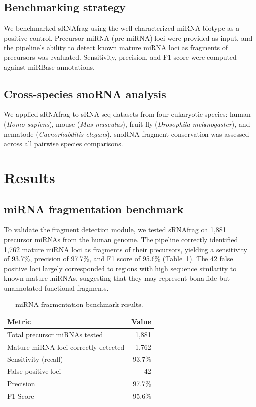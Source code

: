 \documentclass[11pt]{article}
\begin{document}
\subsection{Benchmarking strategy}

We benchmarked sRNAfrag using the well-characterized miRNA biotype as a positive control. Precursor miRNA (pre-miRNA) loci were provided as input, and the pipeline's ability to detect known mature miRNA loci as fragments of precursors was evaluated. Sensitivity, precision, and F1 score were computed against miRBase annotations.

\subsection{Cross-species snoRNA analysis}

We applied sRNAfrag to sRNA-seq datasets from four eukaryotic species: human (\textit{Homo sapiens}), mouse (\textit{Mus musculus}), fruit fly (\textit{Drosophila melanogaster}), and nematode (\textit{Caenorhabditis elegans}). snoRNA fragment conservation was assessed across all pairwise species comparisons.

\section{Results}

\subsection{miRNA fragmentation benchmark}

To validate the fragment detection module, we tested sRNAfrag on 1,881 precursor miRNAs from the human genome. The pipeline correctly identified 1,762 mature miRNA loci as fragments of their precursors, yielding a sensitivity of 93.7\%, precision of 97.7\%, and F1 score of 95.6\% (Table~\ref{tab:mirna_benchmark}). The 42 false positive loci largely corresponded to regions with high sequence similarity to known mature miRNAs, suggesting that they may represent bona fide but unannotated functional fragments.

\begin{table}[ht]
\centering
\caption{miRNA fragmentation benchmark results.}
\label{tab:mirna_benchmark}
\begin{tabular}{lr}
\toprule
\textbf{Metric} & \textbf{Value} \\
\midrule
Total precursor miRNAs tested & 1,881 \\
Mature miRNA loci correctly detected & 1,762 \\
Sensitivity (recall) & 93.7\% \\
False positive loci & 42 \\
Precision & 97.7\% \\
F1 Score & 95.6\% \\
\bottomrule
\end{tabular}
\end{table}
\end{document}
